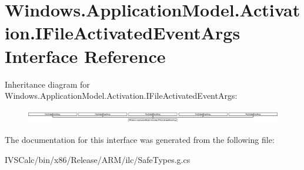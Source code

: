 \hypertarget{interface_windows_1_1_application_model_1_1_activation_1_1_i_file_activated_event_args}{}\section{Windows.\+Application\+Model.\+Activation.\+I\+File\+Activated\+Event\+Args Interface Reference}
\label{interface_windows_1_1_application_model_1_1_activation_1_1_i_file_activated_event_args}
Inheritance diagram for Windows.\+Application\+Model.\+Activation.\+I\+File\+Activated\+Event\+Args\+:\begin{figure}[H]
\begin{center}
\leavevmode
\includegraphics[height=0.602151cm]{interface_windows_1_1_application_model_1_1_activation_1_1_i_file_activated_event_args}
\end{center}
\end{figure}


The documentation for this interface was generated from the following file\+:\begin{DoxyCompactItemize}
\item 
I\+V\+S\+Calc/bin/x86/\+Release/\+A\+R\+M/ilc/Safe\+Types.\+g.\+cs\end{DoxyCompactItemize}
